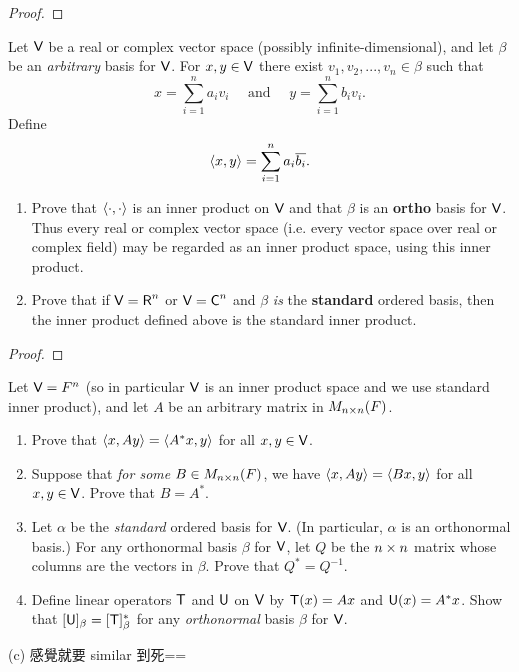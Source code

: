 \begin{proof}
\end{proof}

\begin{exercise} \label{exercise 6.1.22}
Let \(\textsf{V}\) be a real or complex vector space (possibly infinite-dimensional), and let \(\beta\) be an \emph{arbitrary} basis for \(\textsf{V}\).
For \(x, y \in \textsf{V}\) there exist \(v_1, v_2, ..., v_n \in \beta\) such that
\[
    x = \sum_{i = 1}^n a_i v_i \quad \text{ and } \quad y = \sum_{i = 1}^n b_i v_i.
\]
Define
\[
    \left< x, y \right> = \sum_{i = 1}^n a_i \overline{b_i}.
\]
\begin{enumerate}
\item Prove that \(\left< \cdot, \cdot \right>\) is an inner product on \(\textsf{V}\) and that \(\beta\) is an \textbf{ortho} basis for \(\textsf{V}\).
Thus every real or complex vector space (i.e. every vector space over real or complex field) may be regarded as an inner product space, using this inner product.

\item Prove that if \(\textsf{V} = \textsf{R}^n\) or \(\textsf{V} = \textsf{C}^n\) and \(\beta\) \emph{is} the \textbf{standard} ordered basis, then the inner product defined above is the standard inner product.
\end{enumerate}
\end{exercise}

\begin{proof}
\end{proof}

\begin{exercise} \label{exercise 6.1.23}
Let \(\textsf{V} = F^n\) (so in particular \(\textsf{V}\) is an inner product space and we use standard inner product), and let \(A\) be an arbitrary matrix in \(M_{n \times n}(F)\).
\begin{enumerate}
\item Prove that \(\left< x, Ay \right> = \left< A^*x, y \right>\) for all \(x, y \in \textsf{V}\).
\item Suppose that \emph{for some} \(B \in M_{n \times n}(F)\), we have \(\left< x, Ay \right> = \left< B x, y \right>\) for all \(x, y \in \textsf{V}\).
Prove that \(B = A^*\).
\item Let \(\alpha\) be the \emph{standard} ordered basis for \(\textsf{V}\).
(In particular, \(\alpha\) is an orthonormal basis.)
For any orthonormal basis \(\beta\) for \(\textsf{V}\), let \(Q\) be the \(n \times n\) matrix whose columns are the vectors in \(\beta\).
Prove that \(Q^* = Q^{-1}\).
\item Define linear operators \(\textsf{T}\) and \(\textsf{U}\) on \(\textsf{V}\) by \(\textsf{T}(x) = Ax\) and \(\textsf{U}(x) = A^* x\).
Show that \([\textsf{U}]_{\beta} = [\textsf{T}]_{\beta}^*\) for any \emph{orthonormal} basis \(\beta\) for \(\textsf{V}\).

\end{enumerate}
(c) 感覺就要 similar 到死==
\end{exercise}

